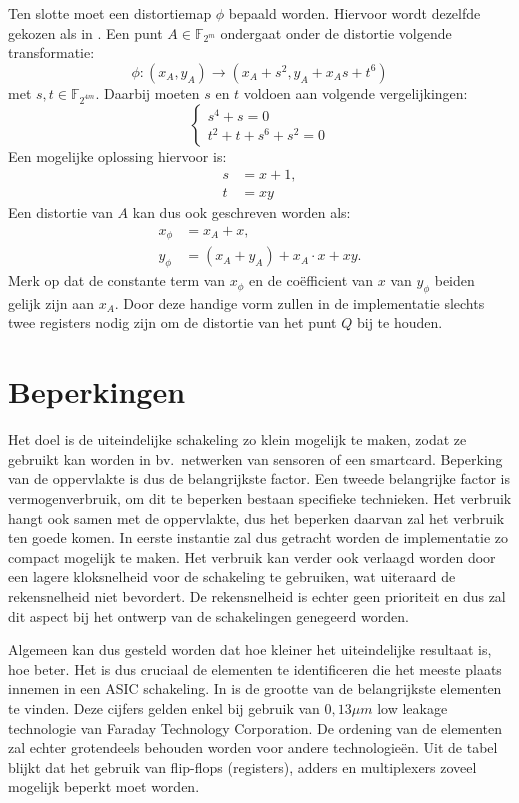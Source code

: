 Ten slotte moet een distortiemap $\phi$ bepaald worden. Hiervoor wordt dezelfde gekozen als in \cite{bertoni}. Een punt $A \in \mathbb{F}_{2^m}$ ondergaat onder de distortie volgende transformatie:
\[\phi : (x_A, y_A) \to (x_A + s^2, y_A + x_A s + t^6)\]
met $s, t \in \mathbb{F}_{2^{4m}}$. Daarbij moeten $s$ en $t$ voldoen aan volgende vergelijkingen:
\[\left\{\begin{array}{l}
s^4 + s = 0\\
t^2 + t + s^6 + s^2 = 0
\end{array}\right.\]
Een mogelijke oplossing hiervoor is:
\[\begin{aligned}
s	&= x + 1,\\
t	&= xy
\end{aligned}\]
Een distortie van $A$ kan dus ook geschreven worden als:
\[\begin{aligned}
x_\phi	&= x_A + x,\\
y_\phi	&= (x_A + y_A) + x_A \cdot x + xy.
\end{aligned}\]
Merk op dat de constante term van $x_\phi$ en de co\"efficient van $x$ van $y_\phi$ beiden gelijk zijn aan $x_A$. Door deze handige vorm zullen in de implementatie slechts twee registers nodig zijn om de distortie van het punt $Q$ bij te houden.

\section{Beperkingen\label{sectie-implementatie-beperkingen}}

Het doel is de uiteindelijke schakeling zo klein mogelijk te maken, zodat ze gebruikt kan worden in bv.\ netwerken van sensoren of een smartcard. Beperking van de oppervlakte is dus de belangrijkste factor. Een tweede belangrijke factor is vermogenverbruik, om dit te beperken bestaan specifieke technieken. Het verbruik hangt ook samen met de oppervlakte, dus het beperken daarvan zal het verbruik ten goede komen. In eerste instantie zal dus getracht worden de implementatie zo compact mogelijk te maken. Het verbruik kan verder ook verlaagd worden door een lagere kloksnelheid voor de schakeling te gebruiken, wat uiteraard de rekensnelheid niet bevordert. De rekensnelheid is echter geen prioriteit en dus zal dit aspect bij het ontwerp van de schakelingen genegeerd worden.

Algemeen kan dus gesteld worden dat hoe kleiner het uiteindelijke resultaat is, hoe beter. Het is dus cruciaal de elementen te identificeren die het meeste plaats innemen in een ASIC schakeling. In  is de grootte van de belangrijkste elementen te vinden. Deze cijfers gelden enkel bij gebruik van $0,13 \mu m$ low leakage technologie van Faraday Technology Corporation. De ordening van de elementen zal echter grotendeels behouden worden voor andere technologie\"en. Uit de tabel blijkt dat het gebruik van flip-flops (registers), adders en multiplexers zoveel mogelijk beperkt moet worden.

